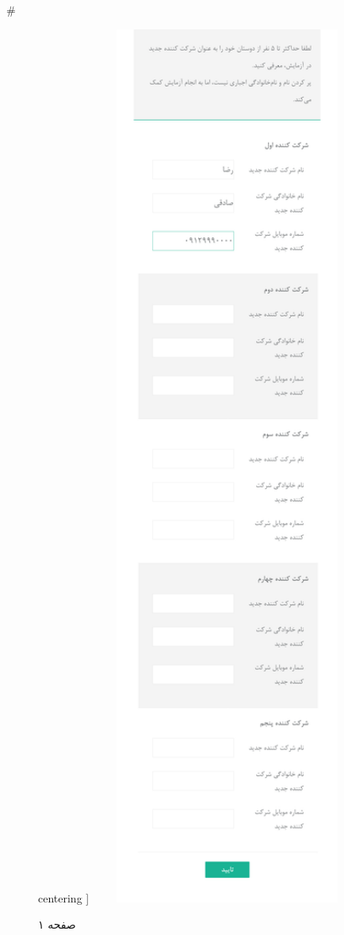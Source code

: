 { 
 # 
\begin{figure}[htpb]
centering ]
\includegraphics[width=0.8\textwidth]{./img/Task3.png/}
\caption{صفحه ۱}
\label{fig:Task1}
\end{figure}
 
}
